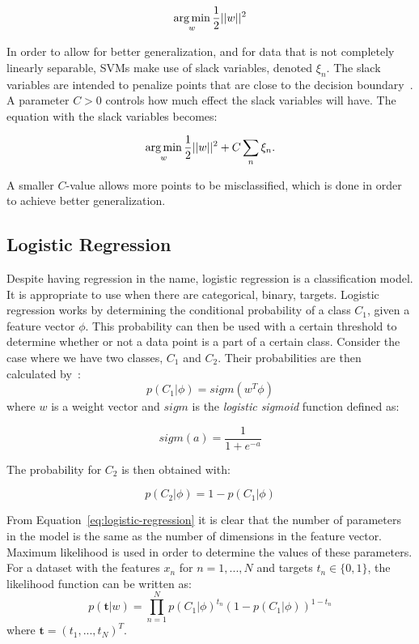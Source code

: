 \begin{equation}
    \operatorname*{arg\,min}_{w}\frac{1}{2}||w||^2
\end{equation}

In order to allow for better generalization, and for data that is not completely linearly separable, SVMs make use of slack variables, denoted $\xi_n$.
The slack variables are intended to penalize points that are close to the decision boundary~\cite{bishop2006pattern}.
A parameter $C>0$ controls how much effect the slack variables will have.
The equation with the slack variables becomes:

\begin{equation}
    \operatorname*{arg\,min}_{w}\frac{1}{2}||w||^2 + C \sum_n\xi_n.
\end{equation}

A smaller $C$-value allows more points to be misclassified, which is done in order to achieve better generalization.

\subsection{Logistic Regression}

Despite having regression in the name, logistic regression is a classification model.
It is appropriate to use when there are categorical, binary, targets.
Logistic regression works by determining the conditional probability of a class $C_1$, given a feature vector $\phi$.
This probability can then be used with a certain threshold to determine whether or not a data point is a part of a certain class.
Consider the case where we have two classes, $C_1$ and $C_2$.
Their probabilities are then calculated by~\cite{bishop2006pattern}:
\begin{equation}\label{eq:logistic-regression}
    p(C_1|\phi) = sigm(w^T\phi)
\end{equation}
where $w$ is a weight vector and $sigm$ is the \textit{logistic sigmoid} function defined as:

\begin{equation}
    sigm(a) = \frac{1}{1+e^{-a}}
\end{equation}

The probability for $C_2$ is then obtained with:

\begin{equation}
    p(C_2|\phi) = 1 - p(C_1|\phi)
\end{equation}

From Equation~\ref{eq:logistic-regression} it is clear that the number of parameters in the model is the same as the number of dimensions in the feature vector.
Maximum likelihood is used in order to determine the values of these parameters.
For a dataset with the features $x_n$ for $n=1,...,N$ and targets $t_n \in \{0,1\}$, the likelihood function can be written as:
\begin{equation}
    p(\boldsymbol{t}|w) = \prod_{n=1}^N p(C_1|\phi)^{t_n}(1-p(C_1|\phi))^{1-t_n}
\end{equation}
where $\boldsymbol{t} = (t_1, ..., t_N)^T$.

